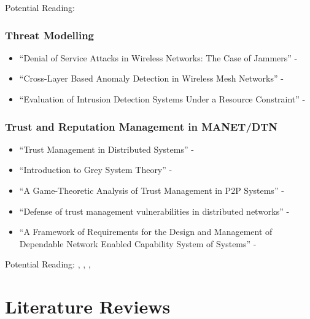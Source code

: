 \documentclass[twoside,10pt,a4paper]{Latex/Classes/PhDthesisPSnPDF}
\begin{document}
Potential Reading: \cite{Johnson2007} \cite{Freitag2004}

\subsection{Threat Modelling}

\begin{itemize}
  \item ``Denial of Service Attacks in Wireless Networks: The Case of Jammers'' - \citet*{Pelechrinis2011}
  \item ``Cross-Layer Based Anomaly Detection in Wireless Mesh Networks'' - \citet*{Wang2009}
  \item ``Evaluation of Intrusion Detection Systems Under a Resource Constraint'' - \citet*{Ryu2008}
\end{itemize}

\subsection{Trust and Reputation Management in MANET/DTN}

\begin{itemize}
  \item ``Trust Management in Distributed Systems'' - \citet*{Li2007}
  \item ``Introduction to Grey System Theory'' - \citet*{Deng1989}
  \item ``A Game-Theoretic Analysis of Trust Management in P2P Systems'' - \citet*{Tuan2006}
  \item ``Defense of trust management vulnerabilities in distributed networks'' - \citet*{Sun2008}
  \item ``A Framework of Requirements for the Design and Management of
    Dependable  Network Enabled Capability System of Systems'' - \citet*{Banks2010}
\end{itemize}

Potential Reading: \cite{Banks2010}, \cite{Fung2011}, \cite{Guan2008}, 
 \cite{Cai2009}

\ifpdf
  \chapter{Literature Reviews}
  
  
  
  
  
\fi

\end{document}
